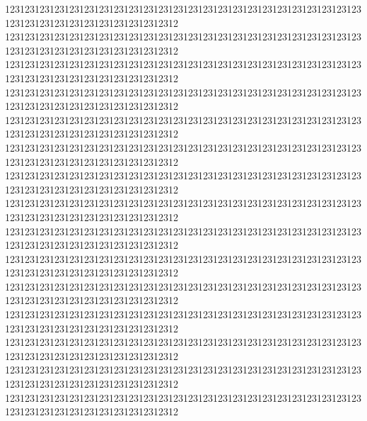 \documentclass[11pt]{ctexbook}
\begin{document}
12312312312312312312312312312312312312312312312312312312312312312312312312312312312312312312312312312312312
12312312312312312312312312312312312312312312312312312312312312312312312312312312312312312312312312312312312
12312312312312312312312312312312312312312312312312312312312312312312312312312312312312312312312312312312312
12312312312312312312312312312312312312312312312312312312312312312312312312312312312312312312312312312312312
12312312312312312312312312312312312312312312312312312312312312312312312312312312312312312312312312312312312
12312312312312312312312312312312312312312312312312312312312312312312312312312312312312312312312312312312312
12312312312312312312312312312312312312312312312312312312312312312312312312312312312312312312312312312312312
12312312312312312312312312312312312312312312312312312312312312312312312312312312312312312312312312312312312
12312312312312312312312312312312312312312312312312312312312312312312312312312312312312312312312312312312312
12312312312312312312312312312312312312312312312312312312312312312312312312312312312312312312312312312312312
12312312312312312312312312312312312312312312312312312312312312312312312312312312312312312312312312312312312
12312312312312312312312312312312312312312312312312312312312312312312312312312312312312312312312312312312312
12312312312312312312312312312312312312312312312312312312312312312312312312312312312312312312312312312312312
12312312312312312312312312312312312312312312312312312312312312312312312312312312312312312312312312312312312
12312312312312312312312312312312312312312312312312312312312312312312312312312312312312312312312312312312312
\end{document}
